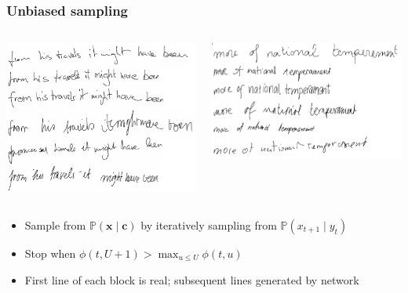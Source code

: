 \documentclass[10pt,xcolor=dvipsnames]{beamer}
\def\bfc{\mathbf{c}}
\def\bfx{\mathbf{x}}
\def\bbP{\mathbb{P}}
\begin{document}
\begin{frame}
  \frametitle{Unbiased sampling}
 \begin{columns}
   \begin{column}{.5\textwidth}
     \includegraphics[width=\linewidth]{fig/fig15a.png}
   \end{column}

   \begin{column}{.5\textwidth}
     \includegraphics[width=\linewidth]{fig/fig15b.png}
   \end{column}
 \end{columns} 
 \begin{itemize}
 \item Sample from $\mathbb{P}(\bfx \mid \bfc)$ by iteratively sampling from
   $\bbP(x_{t+1} \mid y_t)$
 \item Stop when $\phi(t, U+1) > \max_{u \leq U} \phi(t, u)$ 
 \item First line of each block is real; subsequent lines generated by network
 \end{itemize}
\end{frame}
\end{document}
